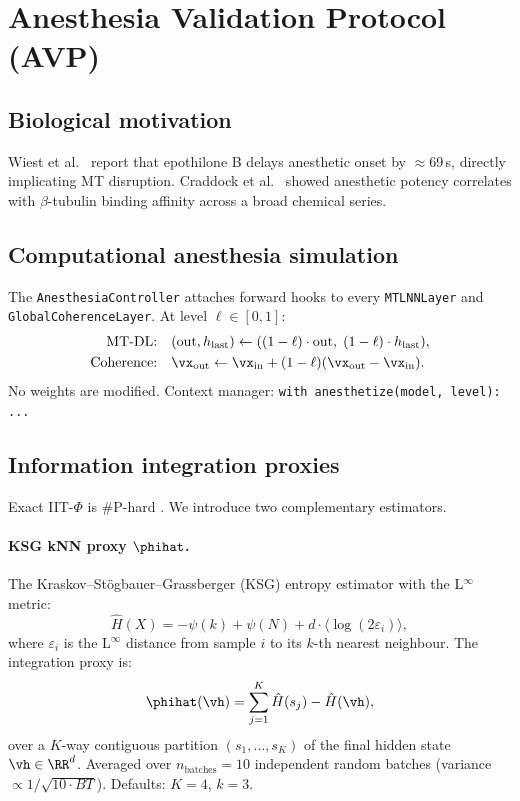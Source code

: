 \section{Anesthesia Validation Protocol (AVP)}
\label{sec:avp}

\subsection{Biological motivation}
Wiest et al.\ \citep{wiest2025quantum} report that epothilone B delays anesthetic onset by $\approx$69\,s, directly implicating MT disruption. Craddock et al.\ \citep{craddock2017anesthetic} showed anesthetic potency correlates with $\beta$-tubulin binding affinity across a broad chemical series.

\subsection{Computational anesthesia simulation}
The \texttt{AnesthesiaController} attaches forward hooks to every \texttt{MTLNNLayer} and \texttt{GlobalCoherenceLayer}. At level $\ell\in[0,1]$:
\begin{align}
  \text{MT-DL:}& \quad (\text{out}, h_\text{last}) \leftarrow ((1-\ell)\cdot\text{out},\;(1-\ell)\cdot h_\text{last}), \\
  \text{Coherence:}& \quad \vx_\text{out} \leftarrow \vx_\text{in} + (1-\ell)(\vx_\text{out}-\vx_\text{in}).
\end{align}
No weights are modified. Context manager: \texttt{with anesthetize(model, level): ...}

\subsection{Information integration proxies}
\label{sec:proxies}
Exact IIT-$\Phi$ is \#P-hard \citep{aaronson2014why}. We introduce two complementary estimators.

\paragraph{KSG kNN proxy $\phihat$.}
The Kraskov--St\"ogbauer--Grassberger (KSG) entropy estimator \citep{kraskov2004estimating} with the L$^\infty$ metric:
\begin{equation}
  \hat{H}(X) = -\psi(k) + \psi(N) + d\cdot\langle\log(2\varepsilon_i)\rangle,
\end{equation}
where $\varepsilon_i$ is the L$^\infty$ distance from sample $i$ to its $k$-th nearest neighbour. The integration proxy is:
\begin{equation}
  \phihat(\vh) = \sum_{j=1}^{K}\hat{H}(s_j) - \hat{H}(\vh),
  \label{eq:phi_hat}
\end{equation}
over a $K$-way contiguous partition $(s_1,\ldots,s_K)$ of the final hidden state $\vh\in\RR^d$. Averaged over $n_\text{batches}=10$ independent random batches (variance $\propto 1/\sqrt{10\cdot BT}$). Defaults: $K=4$, $k=3$.


